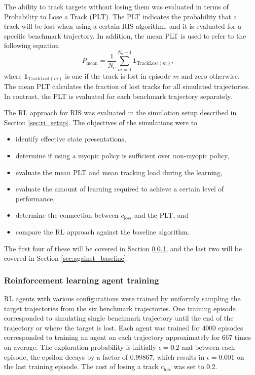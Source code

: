 \documentclass[english, 12pt, a4paper, elec, utf8, a-1b, online]{aaltothesis}
\newcommand{\Ne}{N_\text{e}}
\renewcommand{\vec}[1]{\mathbf{#1}}
\newcommand{\closs}{c_\text{loss}}
\begin{document}
The ability to track targets without losing them was evaluated in terms of Probability to Lose a Track (PLT).
The PLT indicates the probability that a track will be lost when using a certain RIS algorithm, and it is evaluated for a specific benchmark trajectory.
In addition, the mean PLT is used to refer to the following equation
\begin{equation}\label{eq:criterion_lost}
    P_\text{mean} = \frac{1}{\Ne} \sum_{m=0}^{\Ne-1} \vec{1}_{\text{TrackLost}(m)},
\end{equation}
where $\vec{1}_{\text{TrackLost}(m)}$ is one if the track is lost in episode $m$ and zero otherwise.
The mean PLT calculates the fraction of lost tracks for all simulated trajectories.
In contrast, the PLT is evaluated for each benchmark trajectory separately.

The RL approach for RIS was evaluated in the simulation setup described in Section \ref{sec:ri_setup}.
The objectives of the simulations were to
\begin{itemize}
    \item identify effective state presentations,
    \item determine if using a myopic policy is sufficient over non-myopic policy,
    \item evaluate the mean PLT and mean tracking load during the learning,
    \item evaluate the amount of learning required to achieve a certain level of performance,
    \item determine the connection between $\closs$ and the PLT, and
    \item compare the RL approach against the baseline algorithm.
\end{itemize}
The first four of these will be covered in Section \ref{sec:training}, and the last two will be covered in Section \ref{sec:against_baseline}.

\subsubsection{Reinforcement learning agent training}\label{sec:training}

RL agents with various configurations were trained by uniformly sampling the target trajectories from the six benchmark trajectories.
One training episode corresponded to simulating single benchmark trajectory until the end of the trajectory or where the target is lost.
Each agent was trained for $4000$ episodes corresponded to training an agent on each trajectory approximately for $667$ times on average.
The exploration probability is initially $\epsilon=0.2$ and between each episode, the epsilon decays by a factor of $0.99867$, which results in $\epsilon=0.001$ on the last training episode.
The cost of losing a track $\closs$ was set to $0.2$.
\end{document}
